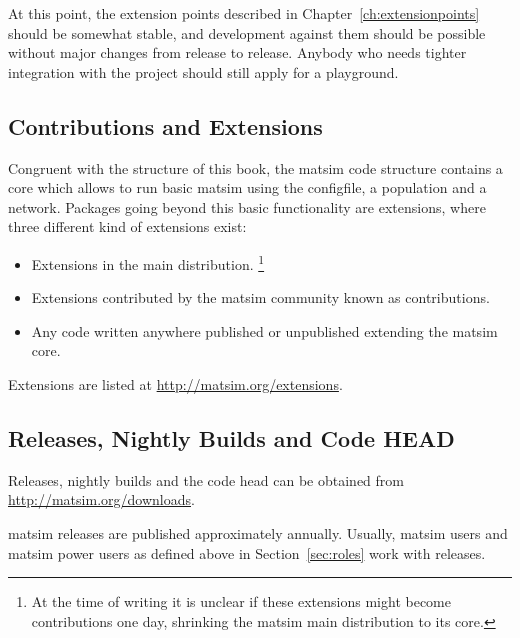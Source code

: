 At this point, the extension points described in Chapter~\ref{ch:extensionpoints} should be somewhat stable, and development against them should be possible without major changes from release to release.  
Anybody who needs tighter integration with the project should still apply for a playground.

\subsection{Contributions and Extensions}
Congruent with the structure of this book, the \gls{matsim} code structure contains a core which allows to run basic \gls{matsim} using the \gls{configfile}, a population and a network. Packages going beyond this basic functionality are \glspl{extension}, where three different kind of extensions exist:
\begin{itemize}\styleItemize 
\item Extensions in the main distribution.%
\footnote{At the time of writing it is unclear if these extensions might become \glspl{contribution} one day, shrinking the \gls{matsim} main distribution to its core.
}
\item Extensions contributed by the \gls{matsim} community known as \glspl{contribution}.
\item Any code written anywhere published or unpublished extending the \gls{matsim} core.
\end{itemize}
Extensions are listed at \url{http://matsim.org/extensions}.

\subsection{Releases, Nightly Builds and Code HEAD}
\label{sec:releases-builds}

Releases, nightly builds and the code head can be obtained 
from \url{http://matsim.org/downloads}.

\gls{matsim} releases are published approximately annually.
Usually, \gls{matsim} users and \gls{matsim} power users as defined above in Section~\ref{sec:roles} work with releases. 

